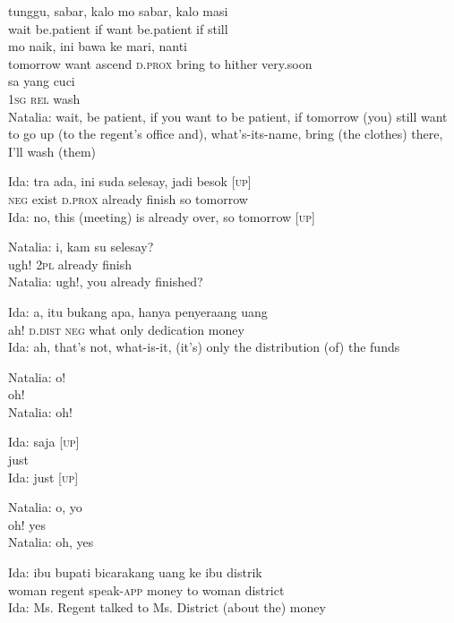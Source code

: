 \ea
{}    {tunggu,}    {sabar,}    {kalo}    {mo}    {sabar,}   kalo   masi\\
   {}    {wait}    {be.patient}    {if}    {want}    {be.patient}   if   still\\
   mo    {naik,}    {ini}    {bawa}    {ke}   mari,    {nanti}\\
   {tomorrow}   want    {ascend}    {\textsc{d.prox}}    {bring}    {to}   hither    {very.soon}\\
\gll  sa    {yang}    {cuci}\\
  \textsc{1sg}    {\textsc{rel}}    {wash}\\
\glt
Natalia: wait, be patient, if you want to be patient, if tomorrow (you) still want to go up (to the regent’s office and), what’s-its-name, bring (the clothes) there, I’ll wash (them)
\z

\ea
\gll   Ida:   tra   ada,   ini   suda   selesay,   jadi   besok   {\upshape\textsc{[up]}}\\
 {}  \textsc{neg}   exist   \textsc{d.prox}   already   finish   so   tomorrow   \\
\glt
Ida: no, this (meeting) is already over, so tomorrow [\textsc{up}]
\z

\ea
\gll   Natalia:   i,   kam   su   selesay?\\
 {}   ugh!   \textsc{2pl}   already   finish\\
\glt
Natalia: ugh!, you already finished?
\z

\ea
\gll   Ida:   a,   itu   bukang   apa,   hanya   penyeraang   uang\\
 {} ah!   \textsc{d.dist}   \textsc{neg}   what   only   dedication   money\\
\glt
Ida: ah, that’s not, what-is-it, (it’s) only the distribution (of) the funds
\z

\ea
\gll   Natalia:   o!\\
  {} oh!\\
\glt
Natalia: oh!
\z

\ea
\gll   Ida:   saja   {\upshape\textsc{[up]}}\\
 {}  just   \\
\glt
Ida: just [\textsc{up}]
\z

\ea
\gll   Natalia:   o,   yo\\
 {}  oh!   yes\\
\glt
Natalia: oh, yes
\z

\ea
\gll   Ida:   ibu   bupati   bicarakang   uang   ke   ibu   distrik\\
 {}    woman   regent   {speak-\textsc{app}}  money   to   woman   district\\
\glt
Ida: Ms. Regent talked to Ms. District (about the) money
\z

